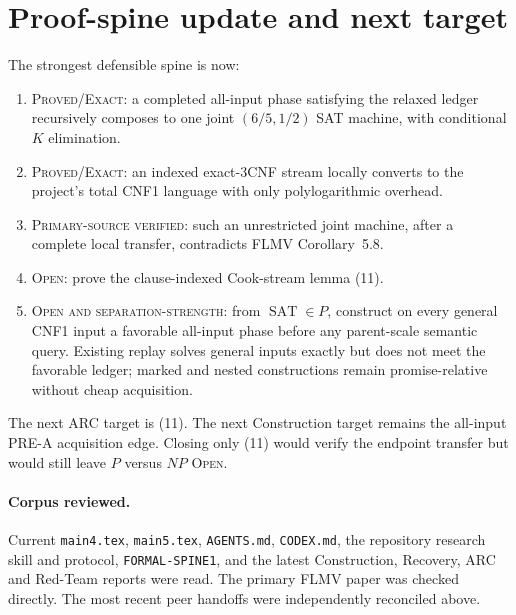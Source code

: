 \documentclass[11pt]{article}
\newcommand{\SAT}{\operatorname{SAT}}
\begin{document}
\section{Proof-spine update and next target}

The strongest defensible spine is now:
\begin{enumerate}
\item \textsc{Proved/Exact}: a completed all-input phase satisfying the
      relaxed ledger recursively composes to one joint
      $(6/5,1/2)$ SAT machine, with conditional $K$ elimination.
\item \textsc{Proved/Exact}: an indexed exact-3CNF stream locally converts to
      the project's total CNF1 language with only polylogarithmic overhead.
\item \textsc{Primary-source verified}: such an unrestricted joint machine,
      after a complete local transfer, contradicts FLMV Corollary~5.8.
\item \textsc{Open}: prove the clause-indexed Cook-stream lemma (11).
\item \textsc{Open and separation-strength}: from $\SAT\in P$, construct on
      every general CNF1 input a favorable all-input phase before any
      parent-scale semantic query.  Existing replay solves general inputs
      exactly but does not meet the favorable ledger; marked and nested
      constructions remain promise-relative without cheap acquisition.
\end{enumerate}

The next ARC target is (11).  The next Construction target remains the
all-input PRE-A acquisition edge.  Closing only (11) would verify the endpoint
transfer but would still leave $P$ versus $NP$ \textsc{Open}.

\paragraph{Corpus reviewed.}
Current \texttt{main4.tex}, \texttt{main5.tex}, \texttt{AGENTS.md},
\texttt{CODEX.md}, the repository research skill and protocol,
\texttt{FORMAL-SPINE1}, and the latest Construction, Recovery, ARC and
Red-Team reports were read.  The primary FLMV paper was checked directly.
The most recent peer handoffs were independently reconciled above.

\end{document}
